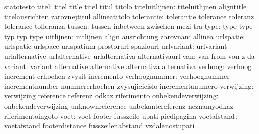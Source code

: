                            statotesto
                    titel: titel                     title
                           titel                     titul
                           titolo
           titeluitlijnen: titeluitlijnen            aligntitle
                           titelausrichten           zarovnejtitul
                           allineatitolo
               tolerantie: tolerantie                tolerance
                           toleranz                  tolerance
                           tolleranza
                   tussen: tussen                    inbetween
                           zwischen                  mezi
                           tra
                     type: type                      type
                           typ                       typ
                           type                      %
                uitlijnen: uitlijnen                 align
                           ausrichtung               zarovnani
                           allinea
                urlspatie: urlspatie                 urlspace
                           urlspatium                prostorurl
                           spaziourl
               urlvariant: urlvariant                urlalternative
                           urlalternative            urlalternativa
                           alternativaurl
                      van: van                       from
                           von                       z
                           da
                  variant: variant                   alternative
                           alternative               alternativa
                           alternativa
                  verhoog: verhoog                   increment
                           erhoehen                  zvysit
                           incremento                %
            verhoognummer: verhoognummer             incrementnumber
                           nummererhoehen            zvysujicicislo
                           incrementanumero
               verwijzing: verwijzing                reference
                           referenz                  odkaz
                           riferimento
      onbekendeverwijzing: onbekendeverwijzing       unknownreference
                           unbekantereferenz         neznamyodkaz
                           riferimentoingoto
                     voet: voet                      footer
                           fusszeile                 upati
                           piedipagina
              voetafstand: voetafstand               footerdistance
                           fusszeilenabstand         vzdalenostupati
